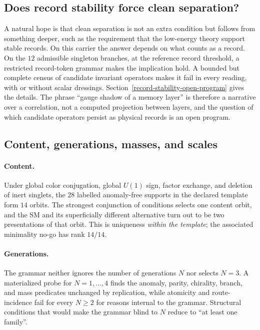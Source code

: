 \subsection{Does record stability force clean separation?}\label{grounding-the-condition-record-stability}

A natural hope is that clean separation is not an extra condition but follows from something deeper, such as the
requirement that the low-energy theory support stable records. On this carrier the answer depends on what counts as a
record. On the \(12\) admissible singleton branches, at the reference record threshold, a restricted record-token grammar
makes the implication hold. A bounded but complete census of candidate invariant operators makes it fail in every
reading, with or without scalar dressings.
Section~\ref{record-stability-open-program} gives the details. The phrase ``gauge shadow of a memory layer'' is
therefore a narrative over a correlation, not a computed projection between layers, and the question of which
candidate operators persist as physical records is an open program.

\subsection{Content, generations, masses, and scales}\label{the-blindness-theorems-what-is-proved-observed-input}

\paragraph{Content.} Under global color conjugation, global \(U(1)\) sign, factor exchange, and deletion of inert
singlets, the \(28\) labelled anomaly-free supports in the declared template form \(14\) orbits. The strongest
conjunction of conditions selects one content orbit, and the SM and its superficially different alternative turn out
to be two presentations of that orbit. This is uniqueness \emph{within the template}; the associated minimality no-go
has rank \(14/14\).

\paragraph{Generations.} The grammar neither ignores the number of generations \(N\) nor selects \(N=3\). A
materialized probe for \(N=1,\dots,4\) finds the anomaly, parity, chirality, branch, and mass predicates unchanged by
replication, while atomicity and route-incidence fail for every \(N\ge2\) for reasons internal to the grammar.
Structural conditions that would make the grammar blind to \(N\) reduce to ``at least one family''.

